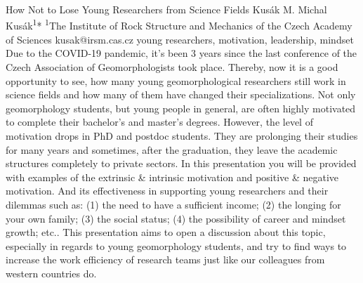 
\abstract
{How Not to Lose Young Researchers from Science Fields} 
{Kusák M.} 
{Michal Kusák\textsuperscript{1}*} 
{\TLtag} 
{
	\textsuperscript{1}The Institute of Rock Structure and Mechanics of the Czech Academy of Sciences
}
{kusak@irsm.cas.cz}  %
{young researchers, motivation, leadership, mindset}
{Due to the COVID-19 pandemic, it’s been 3 years since the last conference of the Czech Association of Geomorphologists took place. Thereby, now it is a good opportunity to see, how many young geomorphological researchers still work in science fields and how many of them have changed their specializations. Not only geomorphology students, but young people in general, are often highly motivated to complete their bachelor's and master's degrees. However, the level of motivation drops in PhD and postdoc students. They are prolonging their studies for many years and sometimes, after the graduation, they leave the academic structures completely to private sectors. In this presentation you will be provided with examples of the extrinsic \& intrinsic motivation and positive \& negative motivation. And its effectiveness in supporting young researchers and their dilemmas such as: (1) the need to have a sufficient income; (2) the longing for your own family; (3) the social status; (4) the possibility of career and mindset growth; etc.. This presentation aims to open a discussion about this topic, especially in regards to young geomorphology students, and try to find ways to increase the work efficiency of research teams just like our colleagues from western countries do.
}
{
}


















